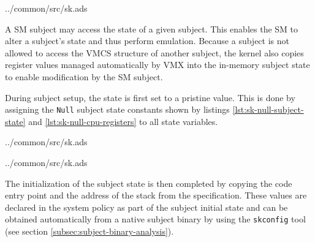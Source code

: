 
	{../common/src/sk.ads}

A SM subject may access the state of a given subject. This enables
the SM to alter a subject's state and thus perform emulation. Because a subject
is not allowed to access the VMCS structure of another subject, the kernel also
copies register values managed automatically by VMX into the
in-memory subject state to enable modification by the SM subject.

During subject setup, the state is first set to a pristine value. This is done
by assigning the \texttt{Null} subject state constants shown by listings
\ref{lst:sk-null-subject-state} and \ref{lst:sk-null-cpu-registers} to all
state variables.


	{../common/src/sk.ads}


	{../common/src/sk.ads}

The initialization of the subject state is then completed by copying the code
entry point and the address of the stack from the specification.  These values
are declared in the system policy as part of the subject initial state and can
be obtained automatically from a native subject binary by using the
\texttt{skconfig} tool (see section \ref{subsec:subject-binary-analysis}).
